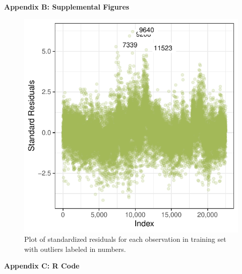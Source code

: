 \documentclass[11pt]{article}\usepackage[]{graphicx}\usepackage[]{color}
\makeatletter
\def\maxwidth{ %
  \ifdim\Gin@nat@width>\linewidth
    \linewidth
  \else
    \Gin@nat@width
  \fi
}
\makeatother
\begin{document}
\clearpage
\newpage
\noindent \Large{{\bf Appendix B: Supplemental Figures}}

\begin{figure}[h!] 
\begin{center}

\includegraphics[width=\maxwidth]{figure/unnamed-chunk-10-1} 

\caption{Plot of standardized residuals for each observation in training set with outliers labeled in numbers.}
\label{diag3}
\end{center} 
\end{figure}


\clearpage
\newpage
\noindent \Large{{\bf Appendix C: R Code}}

\end{document}
